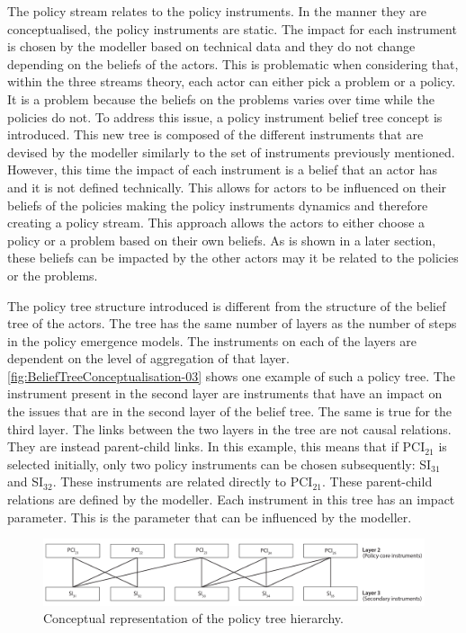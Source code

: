 The policy stream relates to the policy instruments. In the manner they are conceptualised, the policy instruments are static. The impact for each instrument is chosen by the modeller based on technical data and they do not change depending on the beliefs of the actors. This is problematic when considering that, within the three streams theory, each actor can either pick a problem or a policy. It is a problem because the beliefs on the problems varies over time while the policies do not. To address this issue, a policy instrument belief tree concept is introduced. This new tree is composed of the different instruments that are devised by the modeller similarly to the set of instruments previously mentioned. However, this time the impact of each instrument is a belief that an actor has and it is not defined technically. This allows for actors to be influenced on their beliefs of the policies making the policy instruments dynamics and therefore creating a policy stream. This approach allows the actors to either choose a policy or a problem based on their own beliefs. As is shown in a later section, these beliefs can be impacted by the other actors may it be related to the policies or the problems.

The policy tree structure introduced is different from the structure of the belief tree of the actors. The tree has the same number of layers as the number of steps in the policy emergence models. The instruments on each of the layers are dependent on the level of aggregation of that layer. \autoref{fig:BeliefTreeConceptualisation-03} shows one example of such a policy tree. The instrument present in the second layer are instruments that have an impact on the issues that are in the second layer of the belief tree. The same is true for the third layer. The links between the two layers in the tree are not causal relations. They are instead parent-child links. In this example, this means that if PCI$_{21}$ is selected initially, only two policy instruments can be chosen subsequently: SI$_{31}$ and SI$_{32}$. These instruments are related directly to PCI$_{21}$. These parent-child relations are defined by the modeller. Each instrument in this tree has an impact parameter. This is the parameter that can be influenced by the modeller.

\begin{figure}
\centering
\includegraphics[scale = 0.33, angle = 0]{figures/BeliefTreeConceptualisation-03}
\caption{Conceptual representation of the policy tree hierarchy.}
\label{fig:BeliefTreeConceptualisation-03}
\end{figure} 

